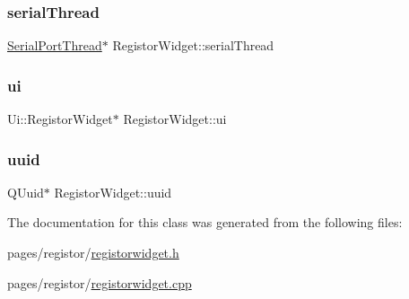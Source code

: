 \mbox{\label{class_registor_widget_a445746b63d370fe0985a4bcd2630a5ac}} 
\subsubsection{\texorpdfstring{serialThread}{serialThread}}
{\footnotesize\ttfamily \mbox{\hyperlink{class_serial_port_thread}{Serial\+Port\+Thread}}$\ast$ Registor\+Widget\+::serial\+Thread\hspace{0.3cm}{\ttfamily [private]}}

\mbox{\label{class_registor_widget_a906ebcf60a8e3e8d8c0c1b43dfada66b}} 
\subsubsection{\texorpdfstring{ui}{ui}}
{\footnotesize\ttfamily Ui\+::\+Registor\+Widget$\ast$ Registor\+Widget\+::ui\hspace{0.3cm}{\ttfamily [private]}}

\mbox{\label{class_registor_widget_a2deb7fe978f1bf51f42281d9145d553d}} 
\subsubsection{\texorpdfstring{uuid}{uuid}}
{\footnotesize\ttfamily Q\+Uuid$\ast$ Registor\+Widget\+::uuid\hspace{0.3cm}{\ttfamily [private]}}



The documentation for this class was generated from the following files\+:\begin{DoxyCompactItemize}
\item 
pages/registor/\mbox{\hyperlink{registorwidget_8h}{registorwidget.\+h}}\item 
pages/registor/\mbox{\hyperlink{registorwidget_8cpp}{registorwidget.\+cpp}}\end{DoxyCompactItemize}
